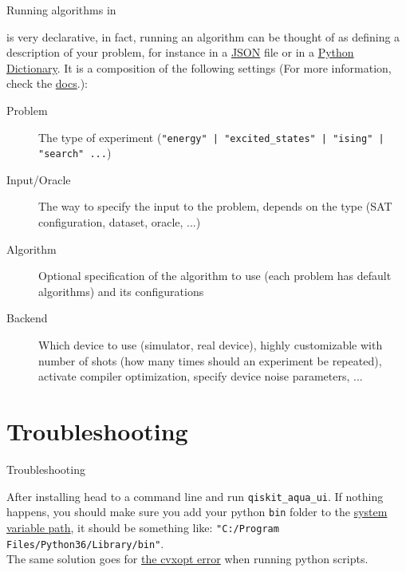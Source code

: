\documentclass[aspectratio=43]{beamer}
\begin{document}
\begin{frame}{Running algorithms in \qka}
\small{
    \qka is very declarative, in fact, running an algorithm can be thought of as defining a description of your problem, for instance in a \href{https://www.json.org/}{JSON} file or in a \href{https://docs.python.org/3/tutorial/datastructures.html#dictionaries}{Python Dictionary}. It is a composition of the following settings (For more information, check the \href{https://qiskit.org/documentation/aqua/execution.html#input-file}{docs}.):
    \begin{description}
        \item[Problem] The type of experiment (\texttt{"energy" | "excited_states" | "ising" | "search" ...})
        \item[Input/Oracle] The way to specify the input to the problem, depends on the type (SAT configuration, dataset, oracle, ...)
        \item[Algorithm] Optional specification of the algorithm to use (each problem has default algorithms) and its configurations
        \item[Backend] Which device to use (simulator, real device), highly customizable with number of shots (how many times should an experiment be repeated), activate compiler optimization, specify device noise parameters, ...
    \end{description}
}
\pagenumber
\end{frame}

\section{Troubleshooting \qka}
\begin{frame}{Troubleshooting \qka}
    \begin{card}
        After installing head to a command line and run  \texttt{qiskit_aqua_ui}. If nothing happens, you should make sure you add your python \texttt{bin} folder to the \href{https://docs.alfresco.com/4.2/tasks/fot-addpath.html}{system variable path}, it should be something like: \texttt{"C:/Program Files/Python36/Library/bin"}.\\
        The same solution goes for \href{https://stackoverflow.com/questions/14778178/import-cvxopt-base-the-specified-module-could-not-be-found}{the cvxopt error} when running python scripts.
    \end{card}
\pagenumber
\end{frame}
\end{document}
